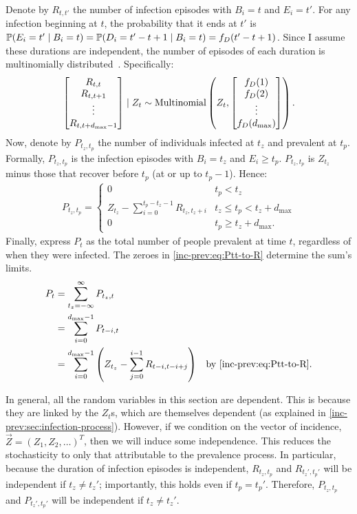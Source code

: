 \documentclass[thesis.tex]{subfiles}
\begin{document}
Denote by $R_{t,t'}$ the number of infection episodes with $B_i=t$ and $E_i=t'$.
For any infection beginning at $t$, the probability that it ends at $t'$ is $\operatorname{\mathbb{P}}(E_i = t' \mid B_i = t) = \operatorname{\mathbb{P}}(D_i = t' - t + 1 \mid B_i = t) = f_D(t' - t + 1)$.
Since I assume these durations are independent, the number of episodes of each duration is multinomially distributed~\autocite{paganoHIV}.
Specifically:
\begin{align}
\begin{bmatrix}
  R_{t,t} \\ R_{t,t+1} \\ \vdots \\ R_{t,t+d_\text{max}-1}
\end{bmatrix} \mid Z_t
\sim \operatorname{Multinomial} \left(
  Z_t, 
  \begin{bmatrix}
    f_D(1) \\ f_D(2) \\ \vdots \\ f_D(d_\text{max})
  \end{bmatrix}
\right).
\end{align}
Now, denote by $P_{t_z,t_p}$ the number of individuals infected at $t_z$ and prevalent at $t_p$.
Formally, $P_{t_z,t_p}$ is the infection episodes with $B_i = t_z$ and $E_i \geq t_p$.
$P_{t_z,t_p}$ is $Z_{t_z}$ minus those that recover before $t_p$ (\ie at or up to $t_p - 1$).
Hence:
\begin{align}
    P_{t_z,t_p} = \begin{cases}
      0 &t_p < t_z\\
      Z_{t_z} - \sum_{i=0}^{t_p-t_z-1} R_{t_z,t_z+i} &t_z \leq t_p < t_z + d_\text{max}\\
      0 &t_p \geq t_z + d_\text{max}.
  \end{cases} \label{inc-prev:eq:Ptt-to-R}
\end{align}
Finally, express $P_t$ as the total number of people prevalent at time $t$, regardless of when they were infected.
The zeroes in \cref{inc-prev:eq:Ptt-to-R} determine the sum's limits.
\begin{align}
  P_t
  &= \sum_{t_z=-\infty}^\infty P_{t_z,t} \\
  &= \sum_{i=0}^{\dmax-1} P_{t-i,t} \label{inc-prev:eq:Pt-to-Ptt} \\
  &= \sum_{i=0}^{\dmax-1} \left(Z_{t_z} - \sum_{j=0}^{i-1} R_{t-i,t-i+j} \right) &\text{by \cref{inc-prev:eq:Ptt-to-R}}\label{inc-prev:eq:Pt-to-Rtt}.
\end{align}

In general, all the random variables in this section are dependent.
This is because they are linked by the $Z_t$s, which are themselves dependent (as explained in \cref{inc-prev:sec:infection-process}).
However, if we condition on the vector of incidence, $\vec{Z} = (Z_1, Z_2, \dots)^T$, then we will induce some independence.
This reduces the stochasticity to only that attributable to the prevalence process.
In particular, because the duration of infection episodes is independent, $R_{t_z,t_p}$ and $R_{t_z',t_p'}$ will be independent if $t_z \neq t_z'$; importantly, this holds even if $t_p = t_p'$.
Therefore, $P_{t_z,t_p}$ and $P_{t_z',t_p'}$ will be independent if $t_z \neq t_z'$.
\end{document}
